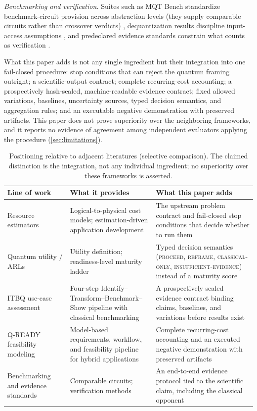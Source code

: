 \emph{Benchmarking and verification.} Suites such as MQT Bench standardize benchmark-circuit provision across abstraction levels (they supply comparable circuits rather than crossover verdicts) \citep{quetschlich2023}, dequantization results discipline input-access assumptions \citep{tang2019,tang2021}, and predeclared evidence standards constrain what counts as verification \citep{eisert2020}.

What this paper adds is not any single ingredient but their integration into one fail-closed procedure: stop conditions that can reject the quantum framing outright; a scientific-output contract; complete recurring-cost accounting; a prospectively hash-sealed, machine-readable evidence contract; fixed allowed variations, baselines, uncertainty sources, typed decision semantics, and aggregation rules; and an executable negative demonstration with preserved artifacts. This paper does not prove superiority over the neighboring frameworks, and it reports no evidence of agreement among independent evaluators applying the procedure (\cref{sec:limitations}).

\begin{table}[htbp]
\centering\small
\begin{tabular}{p{}p{}p{}}
\toprule
\textbf{Line of work} & \textbf{What it provides} & \textbf{What this paper adds} \\
\midrule
Resource estimators \citep{beverland2022,vandam2024,quetschlich2024resource} & Logical-to-physical cost models; estimation-driven application development & The upstream problem contract and fail-closed stop conditions that decide whether to run them \\
Quantum utility / ARLs \citep{herrmann2023} & Utility definition; readiness-level maturity ladder & Typed decision semantics (\textsc{proceed}, \textsc{reframe}, \textsc{classical-only}, \textsc{insufficient-evidence}) instead of a maturity score \\
ITBQ use-case assessment \citep{marthaler2025} & Four-step Identify--Transform--Benchmark--Show pipeline with classical benchmarking & A prospectively sealed evidence contract binding claims, baselines, and variations before results exist \\
Q-READY feasibility modeling \citep{yue2026qready} & Model-based requirements, workflow, and feasibility pipeline for hybrid applications & Complete recurring-cost accounting and an executed negative demonstration with preserved artifacts \\
Benchmarking and evidence standards \citep{quetschlich2023,eisert2020} & Comparable circuits; verification methods & An end-to-end evidence protocol tied to the scientific claim, including the classical opponent \\
\bottomrule
\end{tabular}
\caption{Positioning relative to adjacent literatures (selective comparison). The claimed distinction is the integration, not any individual ingredient; no superiority over these frameworks is asserted.}
\label{tab:related}
\end{table}
